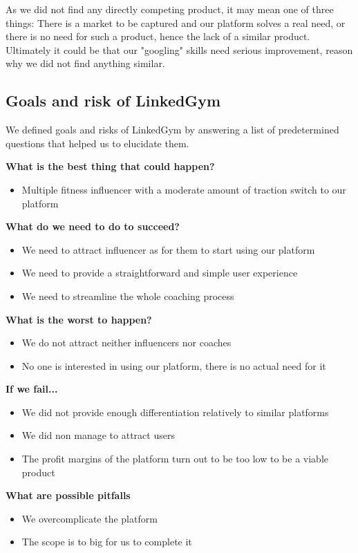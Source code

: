 As we did not find any directly competing product, it may mean one of three things: There is a market to be captured and our platform solves a real need, or there is no need for such a product, hence the lack of a similar product. Ultimately it could be that our "googling" skills need serious improvement, reason why we did not find anything similar.

\subsection{Goals and risk of LinkedGym}

We defined goals and risks of LinkedGym by answering a list of predetermined questions that helped us to elucidate them.

\textbf{What is the best thing that could happen?}
\begin{itemize}
  \item Multiple fitness influencer with a moderate amount of traction switch to our platform
\end{itemize}
\textbf{What do we need to do to succeed?}
\begin{itemize}
  \item We need to attract influencer as for them to start using our platform
  \item We need to provide a straightforward and simple user experience
  \item We need to streamline the whole coaching process
\end{itemize}

\textbf{What is the worst to happen?}
\begin{itemize}
  \item We do not attract neither influencers nor coaches
  \item No one is interested in using our platform, there is no actual need for it
\end{itemize}

\textbf{If we fail...}
\begin{itemize}
  \item We did not provide enough differentiation relatively to similar platforms
  \item We did non manage to attract users
  \item  The profit margins of the platform turn out to be too low to be a viable product
\end{itemize}


\textbf{What are possible pitfalls}
\begin{itemize}
  \item We overcomplicate the platform
  \item The scope is to big for us to complete it
\end{itemize}

